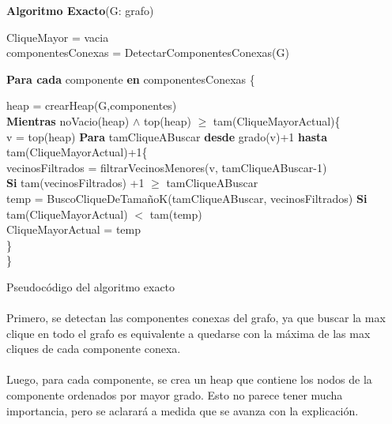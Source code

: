 \vspace{2em}
\incmargin{3em}
\linesnumbered
{}
\footnotesize 
\textbf{Algoritmo Exacto}(G: grafo) \\
\begin{algorithm}[H]
	\BlankLine
		CliqueMayor = vacia\\
		componentesConexas = DetectarComponentesConexas(G)
		\BlankLine

		\textbf{Para cada} componente \textbf{en} componentesConexas \{ 
		\BlankLine

		\tab\tab heap = crearHeap(G,componentes) \\

		\BlankLine
		\tab\tab \textbf{Mientras} noVacio(heap) $\wedge$ top(heap) $\geq$ tam(CliqueMayorActual)\{\\
		\BlankLine
		\tab\tab\tab v = top(heap)
		\BlankLine
		\tab\tab\tab \textbf{Para} tamCliqueABuscar \textbf{desde} grado(v)+1 \textbf{hasta} tam(CliqueMayorActual)+1\{\\
		\tab\tab\tab\tab vecinosFiltrados = 	filtrarVecinosMenores(v, tamCliqueABuscar-1)\\						
		\tab\tab\tab\tab \textbf{Si} tam(vecinosFiltrados) +1 $\geq$ tamCliqueABuscar\\ 			
		\tab\tab\tab\tab\tab temp = BuscoCliqueDeTamañoK(tamCliqueABuscar, vecinosFiltrados)
		\BlankLine
		\tab\tab\tab\tab\tab \textbf{Si}  tam(CliqueMayorActual)  $<$ tam(temp)\\ 
		\tab\tab\tab\tab\tab\tab CliqueMayorActual  = temp\\
		\tab\tab\tab\}\\
		\tab\tab\}
\caption{Pseudocódigo del algoritmo exacto}
\end{algorithm}

\normalsize

\paragraph{}
Primero, se detectan las componentes conexas del grafo, ya que buscar la max clique en todo el grafo es equivalente a quedarse con la máxima de las max cliques de cada componente conexa.

\paragraph{}
Luego, para cada componente, se crea un heap que contiene los nodos de la componente ordenados por mayor grado. Esto no parece tener mucha importancia, pero se aclarará a medida que se avanza con la explicación.

